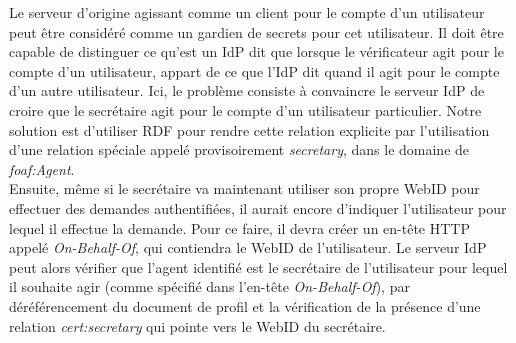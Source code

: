 \documentclass[a4paper]{article}
\begin{document}
Le serveur d'origine agissant comme un client pour le compte d'un utilisateur peut être considéré comme un gardien de secrets pour cet utilisateur. Il doit être capable de distinguer ce qu'est un IdP dit que lorsque le vérificateur agit pour le compte d'un utilisateur, appart de ce que l'IdP dit quand il agit pour le compte d'un autre utilisateur. Ici, le problème consiste à convaincre le serveur IdP de croire que le secrétaire agit pour le compte d'un utilisateur particulier. Notre solution est d'utiliser RDF pour rendre cette relation explicite par l'utilisation d'une relation spéciale appelé provisoirement \textit{secretary}, dans le domaine de \textit{foaf:Agent}.\\


Ensuite, même si le secrétaire va maintenant utiliser son propre WebID pour effectuer des demandes authentifiées, il aurait encore d'indiquer l'utilisateur pour lequel il effectue la demande. Pour ce faire, il devra créer un en-tête HTTP appelé \textit{On-Behalf-Of}, qui contiendra le WebID de l'utilisateur. Le serveur IdP peut alors vérifier que l'agent identifié est le secrétaire de l'utilisateur pour lequel il souhaite agir (comme spécifié dans l'en-tête \textit{On-Behalf-Of}), par déréférencement du document de profil et la vérification de la présence d'une relation \textit{cert:secretary} qui pointe vers le WebID du secrétaire.
\end{document}
